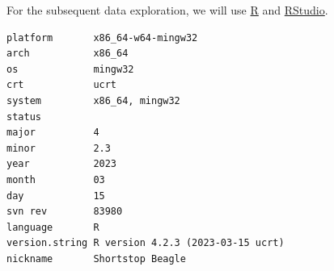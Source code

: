 For the subsequent data exploration, we will use \href{https://www.r-project.org/}{R} and \href{https://posit.co/download/rstudio-desktop/}{RStudio}.

\begin{Shaded}
\begin{Highlighting}[]
\end{Highlighting}
\end{Shaded}

\begin{verbatim}
platform       x86_64-w64-mingw32               
arch           x86_64                           
os             mingw32                          
crt            ucrt                             
system         x86_64, mingw32                  
status                                          
major          4                                
minor          2.3                              
year           2023                             
month          03                               
day            15                               
svn rev        83980                            
language       R                                
version.string R version 4.2.3 (2023-03-15 ucrt)
nickname       Shortstop Beagle                 
\end{verbatim}
